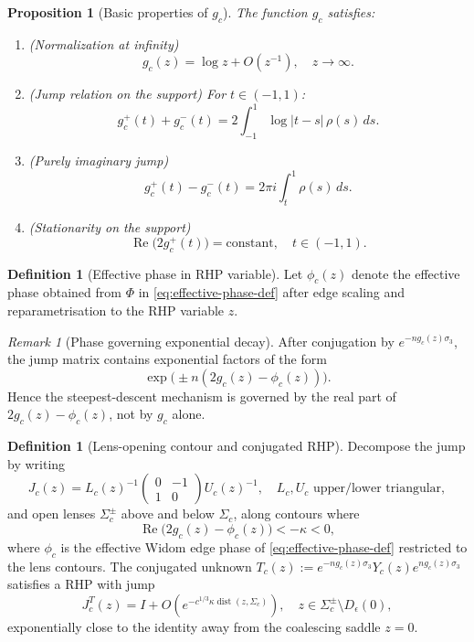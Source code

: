 \documentclass[12pt,a4paper]{amsart}
\newtheorem{proposition}[theorem]{Proposition}
\theoremstyle{definition}
\newtheorem{definition}[theorem]{Definition}
\theoremstyle{remark}
\newtheorem{remark}[theorem]{Remark}
\begin{document}
\begin{proposition}[Basic properties of $g_c$]
\label{prop:g-properties}
The function $g_c$ satisfies:
\begin{enumerate}[label=(\roman*)]
\item (Normalization at infinity)
\[
  g_c(z)=\log z + O(z^{-1}), \quad z\to\infty.
\]
\item (Jump relation on the support)
For $t\in(-1,1)$:
\[
  g_c^+(t)+g_c^-(t)=2\int_{-1}^{1}\log|t-s|\,\rho(s)\,ds.
\]
\item (Purely imaginary jump)
\[
  g_c^+(t)-g_c^-(t)=2\pi i \int_t^1 \rho(s)\,ds.
\]
\item (Stationarity on the support)
\[
  \operatorname{Re}\bigl(2g_c^+(t)\bigr) = \text{constant},
  \quad t\in(-1,1).
\]
\end{enumerate}
\end{proposition}

\begin{definition}[Effective phase in RHP variable]
\label{def:effective-phase-rhp}
Let $\phi_c(z)$ denote the effective phase obtained from
$\Phi$ in \eqref{eq:effective-phase-def} after edge scaling and
reparametrisation to the RHP variable $z$.
\end{definition}

\begin{remark}[Phase governing exponential decay]
\label{rem:phase-governs}
After conjugation by $e^{-n g_c(z)\sigma_3}$, the jump matrix
contains exponential factors of the form
\[
  \exp\!\bigl( \pm n(2g_c(z) - \phi_c(z)) \bigr).
\]
Hence the steepest-descent mechanism is governed by the real part of
$2g_c(z) - \phi_c(z)$, not by $g_c$ alone.
\end{remark}

\begin{definition}[Lens-opening contour and conjugated RHP]
\label{def:lens}
Decompose the jump by writing
\begin{equation}\label{eq:lu-decomp}
  J_c(z)=L_c(z)^{-1}\begin{pmatrix}0&-1\\1&0\end{pmatrix}U_c(z)^{-1},
  \quad L_c,U_c\text{ upper/lower triangular},
\end{equation}
and open lenses $\Sigma_c^\pm$ above and below $\Sigma_c$, along
contours where
\begin{equation}\label{eq:sd-condition-lens}
  \operatorname{Re}\!\bigl(2g_c(z)-\phi_c(z)\bigr)<-\kappa<0,
\end{equation}
where $\phi_c$ is the effective Widom edge phase of
\eqref{eq:effective-phase-def} restricted to the lens contours.
The conjugated unknown $T_c(z):=e^{-ng_c(z)\sigma_3}Y_c(z)e^{ng_c(z)\sigma_3}$
satisfies a RHP with jump
\begin{equation}\label{eq:T-jump}
  J_c^T(z)=I+O(e^{-c^{1/3}\kappa\operatorname{dist}(z,\Sigma_c)}),
  \quad z\in\Sigma_c^\pm\setminus D_\epsilon(0),
\end{equation}
exponentially close to the identity away from the coalescing saddle $z=0$.
\end{definition}
\end{document}
